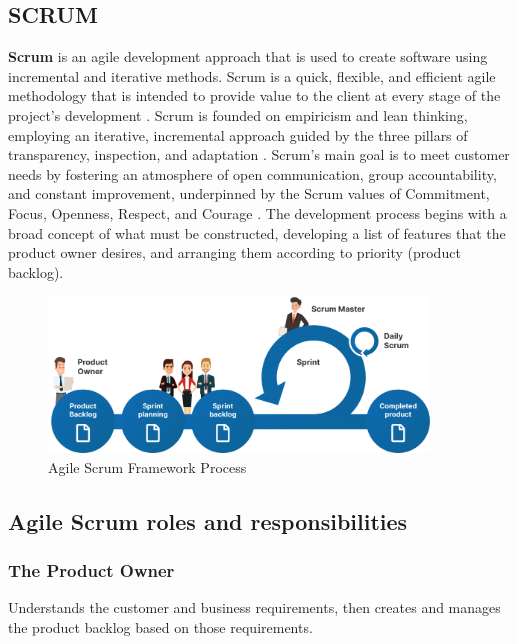 \subsection{SCRUM}

\textbf{\textcolor{primary}{Scrum}} is an agile development approach that is used to create software using incremental and iterative methods. Scrum is a quick, flexible, and efficient agile methodology that is intended to provide value to the client at every stage of the project's development \cite{ScrumGuide2020}. Scrum is founded on empiricism and lean thinking, employing an iterative, incremental approach guided by the three pillars of transparency, inspection, and adaptation \cite{AtlassianScrumPillars, ScrumGuide2020}. Scrum's main goal is to meet customer needs by fostering an atmosphere of open communication, group accountability, and constant improvement, underpinned by the Scrum values of Commitment, Focus, Openness, Respect, and Courage \cite{ScrumGuide2020}. The development process begins with a broad concept of what must be constructed, developing a list of features that the product owner desires, and arranging them according to priority (product backlog).

\begin{figure}[ht!]
    \centering
    \includegraphics[width=0.9\textwidth]{images/agile.png}
    \caption{Agile Scrum Framework Process}
    \label{fig:agile-scrum}
\end{figure}

\subsection{Agile Scrum roles and responsibilities}

\subsubsection{The Product Owner}

Understands the customer and business requirements, then creates and manages the product backlog based on those requirements.


